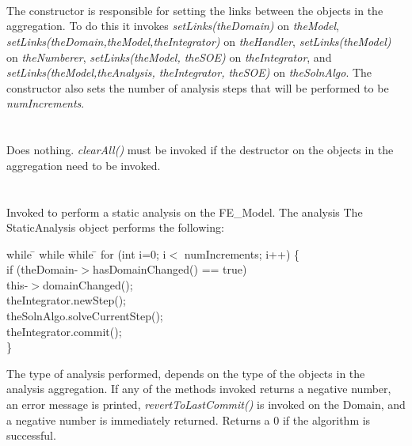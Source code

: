  \\
 \\ \\
The constructor is responsible for setting the links between the
objects in the aggregation. To do this it invokes {\em
setLinks(theDomain)} on {\em theModel}, {\em
setLinks(theDomain,theModel,theIntegrator)} on {\em theHandler}, 
{\em setLinks(theModel)} on {\em theNumberer}, {\em
setLinks(theModel, theSOE)} on {\em theIntegrator}, and  {\em
setLinks(theModel,theAnalysis, theIntegrator, theSOE)} on {\em
theSolnAlgo}.  The constructor also sets the number of analysis steps
that will be performed to be {\em numIncrements}.\\


 \\
\\ 
Does nothing. {\em clearAll()} must be invoked if the destructor on
the objects in the aggregation need to be invoked. \\

\\
 \\
Invoked to perform a static analysis on the FE\_Model. The analysis 
The StaticAnalysis object performs the following:
\begin{tabbing}
while \= \+ while \= while \= \kill
    for (int i=0; i$<$ numIncrements; i++) \{ \+ \\
    if (theDomain-$>$hasDomainChanged() == true) \+\\
	this-$>$domainChanged(); \- \\
    theIntegrator.newStep(); \\
    theSolnAlgo.solveCurrentStep(); \\
    theIntegrator.commit(); \- \\ \} \\
\end{tabbing}
\noindent The type of analysis performed, depends on the type of the
objects in the analysis aggregation. If any of the methods invoked
returns a negative number, an error message is printed, {\em
revertToLastCommit()} is invoked on the Domain, and a negative number
is immediately returned. Returns a $0$ if the algorithm is successful. \\

